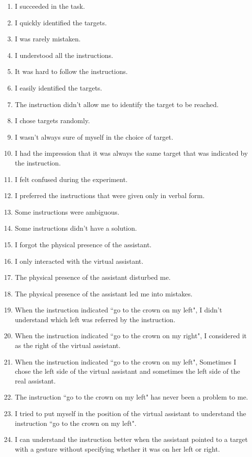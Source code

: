 \begin{appendices}
\begin{enumerate}
	\item I succeeded in the task.
	\item I quickly identified the targets.
	\item I was rarely mistaken.
	\item I understood all the instructions.
	\item It was hard to follow the instructions.
	\item I easily identified the targets.
	\item The instruction didn't allow me to identify the target to be reached.
	\item I chose targets randomly.
	\item I wasn't always sure of myself in the choice of target.
	\item I had the impression that it was always the same target that was indicated by the instruction.
	\item I felt confused during the experiment.
	\item I preferred the instructions that were given only in verbal form.
	\item Some instructions were ambiguous.
	\item Some instructions didn't have a solution.
	\item I forgot the physical presence of the assistant.
	\item I only interacted with the virtual assistant.
	\item The physical presence of the assistant disturbed me.
	\item The physical presence of the assistant led me into mistakes.
	\item When the instruction indicated ``go to the crown on my left", I didn't understand which left was referred by the instruction.
	\item When the instruction indicated ``go to the crown on my right", I considered it as the right of the virtual assistant.
	\item When the instruction indicated ``go to the crown on my left", Sometimes I chose the left side of the virtual assistant and sometimes the left side of the real assistant.
	\item The instruction ``go to the crown on my left" has never been a problem to me.
	\item I tried to put myself in the position of the virtual assistant to understand the instruction ``go to the crown on my left".
	\item I can understand the instruction better when the assistant pointed to a target with a gesture without specifying whether it was on her left or right.

\end{enumerate}
\end{appendices}
